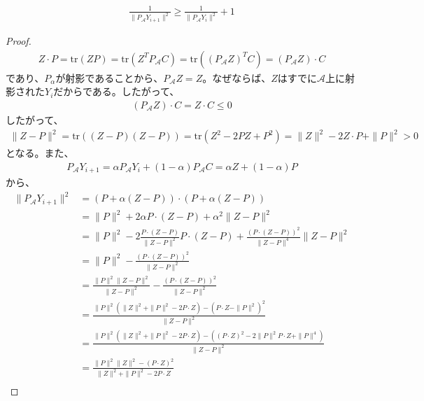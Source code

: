 \begin{lemma*}
  \begin{align*}
    \frac{1}{\|P_\mathcal{A} Y_{i + 1}\|^2} \geq \frac{1}{\|P_\mathcal{A} Y_i\|^2} + 1
  \end{align*}
\end{lemma*}
\begin{proof}
  \begin{align*}
    Z \cdot P = \mathrm{tr}(Z P) = \mathrm{tr}(Z^T P_\mathcal{A} C) = \mathrm{tr}((P_\mathcal{A} Z)^T C) = (P_\mathcal{A} Z) \cdot C
  \end{align*}
  であり、$P_\alpha$が射影であることから、$P_\mathcal{A} Z = Z$。なぜならば、$Z$はすでに$\mathcal{A}$上に射影された$Y_i$だからである。したがって、
  \begin{align*}
    (P_\mathcal{A} Z) \cdot C = Z \cdot C \leq 0
  \end{align*}
  したがって、
  \begin{align*}
    \|Z - P\|^2 = \mathrm{tr}((Z - P)(Z - P)) = \mathrm{tr}(Z^2 - 2 P Z + P^2) = \|Z\|^2 - 2 Z \cdot P + \|P\|^2 > 0
  \end{align*}
  となる。また、
  \begin{align*}
    P_\mathcal{A} Y_{i + 1} = \alpha P_\mathcal{A} Y_i + (1 - \alpha) P_\mathcal{A} C = \alpha Z + (1 - \alpha) P
  \end{align*}
  から、
  \begin{align*}
    \|P_\mathcal{A} Y_{i + 1}\|^2 & = (P + \alpha (Z - P)) \cdot (P + \alpha (Z - P)) \\
                                  & = \|P\|^2 + 2 \alpha P \cdot (Z - P) + \alpha^2 \|Z - P\|^2 \\
                                  & = \|P\|^2 - 2 \frac{P \cdot (Z - P)}{\|Z - P\|^2} P \cdot (Z - P) + \frac{(P \cdot (Z - P))^2}{\|Z - P\|^4} \|Z - P\|^2 \\
                                  & = \|P\|^2 - \frac{(P \cdot (Z - P))^2}{\|Z - P\|^2} \\
                                  & = \frac{\|P\|^2 \|Z - P\|^2}{\|Z - P\|^2} - \frac{(P \cdot (Z - P))^2}{\|Z - P\|^2} \\
                                  & = \frac{\|P\|^2 (\|Z\|^2 + \|P\|^2 - 2 P \cdot Z) - (P \cdot Z - \|P\|^2)^2}{\|Z - P\|^2} \\
                                  & = \frac{\|P\|^2 (\|Z\|^2 + \|P\|^2 - 2 P \cdot Z) - ((P \cdot Z)^2 - 2 \|P\|^2 P \cdot Z + \|P\|^4)}{\|Z - P\|^2} \\
                                  & = \frac{\|P\|^2 \|Z\|^2 - (P \cdot Z)^2}{\|Z\|^2 + \|P\|^2 - 2 P \cdot Z} \\

\end{align*}
\end{proof}
